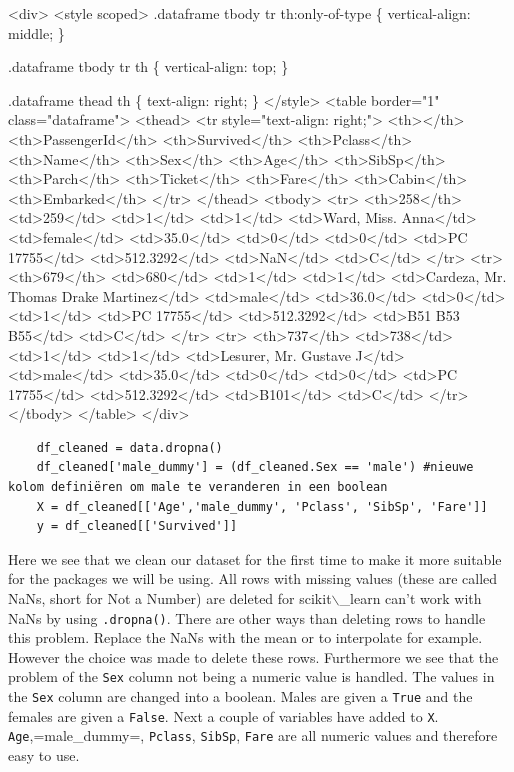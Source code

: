 \documentclass[11pt]{article}
\begin{document}
\begin{HTML}
<div>
<style scoped>
    .dataframe tbody tr th:only-of-type \{
	vertical-align: middle;
    \}

.dataframe tbody tr th \{
    vertical-align: top;
\}

    .dataframe thead th \{
	text-align: right;
    \}
</style>
<table border="1" class="dataframe">
  <thead>
    <tr style="text-align: right;">
      <th></th>
      <th>PassengerId</th>
      <th>Survived</th>
      <th>Pclass</th>
      <th>Name</th>
      <th>Sex</th>
      <th>Age</th>
      <th>SibSp</th>
      <th>Parch</th>
      <th>Ticket</th>
      <th>Fare</th>
      <th>Cabin</th>
      <th>Embarked</th>
    </tr>
  </thead>
  <tbody>
    <tr>
      <th>258</th>
      <td>259</td>
      <td>1</td>
      <td>1</td>
      <td>Ward, Miss. Anna</td>
      <td>female</td>
      <td>35.0</td>
      <td>0</td>
      <td>0</td>
      <td>PC 17755</td>
      <td>512.3292</td>
      <td>NaN</td>
      <td>C</td>
    </tr>
    <tr>
      <th>679</th>
      <td>680</td>
      <td>1</td>
      <td>1</td>
      <td>Cardeza, Mr. Thomas Drake Martinez</td>
      <td>male</td>
      <td>36.0</td>
      <td>0</td>
      <td>1</td>
      <td>PC 17755</td>
      <td>512.3292</td>
      <td>B51 B53 B55</td>
      <td>C</td>
    </tr>
    <tr>
      <th>737</th>
      <td>738</td>
      <td>1</td>
      <td>1</td>
      <td>Lesurer, Mr. Gustave J</td>
      <td>male</td>
      <td>35.0</td>
      <td>0</td>
      <td>0</td>
      <td>PC 17755</td>
      <td>512.3292</td>
      <td>B101</td>
      <td>C</td>
    </tr>
  </tbody>
</table>
</div>
\end{HTML}

\begin{verbatim}
    df_cleaned = data.dropna()
    df_cleaned['male_dummy'] = (df_cleaned.Sex == 'male') #nieuwe kolom definiëren om male te veranderen in een boolean
    X = df_cleaned[['Age','male_dummy', 'Pclass', 'SibSp', 'Fare']]
    y = df_cleaned[['Survived']]
\end{verbatim}

Here we see that we clean our dataset for the first time to make it more
suitable for the packages we will be using. All rows with missing values
(these are called NaNs, short for Not a Number) are deleted for
scikit$\backslash$\_learn can't work with NaNs by using \texttt{.dropna()}. There are other
ways than deleting rows to handle this problem. Replace the NaNs with
the mean or to interpolate for example. However the choice was made to
delete these rows. Furthermore we see that the problem of the \texttt{Sex}
column not being a numeric value is handled. The values in the \texttt{Sex}
column are changed into a boolean. Males are given a \texttt{True} and the
females are given a \texttt{False}. Next a couple of variables have added to
\texttt{X}. \texttt{Age},=male\_dummy=, \texttt{Pclass}, \texttt{SibSp}, \texttt{Fare} are all numeric
values and therefore easy to use.
\end{document}
